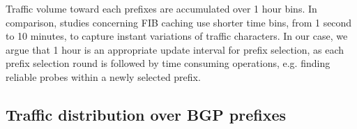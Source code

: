 Traffic volume toward each prefixes are accumulated over 1 hour bins.
In comparison, studies concerning FIB caching \cite{Sarrar2012, Zhang2012} use shorter time bins, from 1 second to 10 minutes, to capture instant variations of traffic characters.
In our case, we argue that 1 hour is an appropriate update interval for 
prefix selection, as each prefix selection round is followed by time consuming operations, e.g. finding reliable probes within a newly selected prefix. 

\subsection{Traffic distribution over BGP prefixes}
\label{sec:dis}

